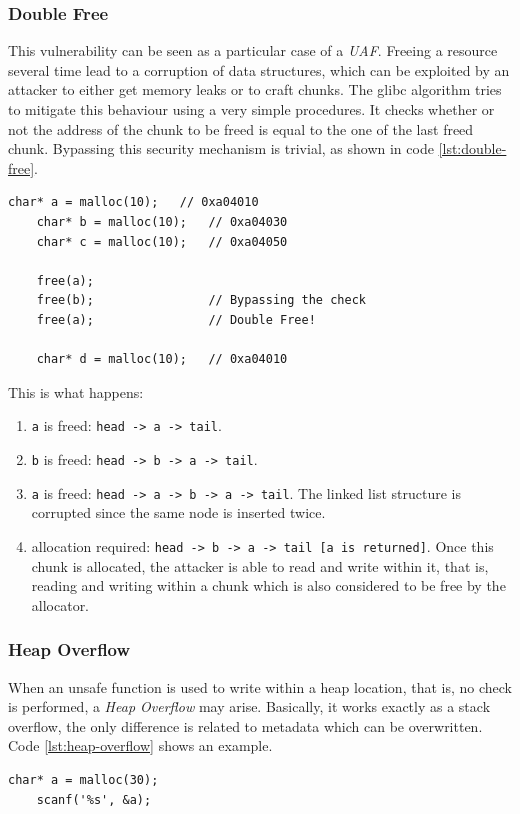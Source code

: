 \documentclass{article}
\numberwithin{equation}{subsection}
\begin{document}
\subsubsection{Double Free}
This vulnerability can be seen as a particular case of a \emph{UAF}. Freeing a resource several time lead to a corruption of data structures, which can be exploited by an attacker to either get memory leaks or to craft chunks. The glibc algorithm tries to mitigate this behaviour using a very simple procedures. It checks whether or not the address of the chunk to be freed is equal to the one of the last freed chunk. Bypassing this security mechanism is trivial, as shown in code \ref{lst:double-free}.\newline
\noindent
\begin{minipage}{\textwidth}
\centering
    \lstset{style=cstyle}
    \begin{lstlisting}[caption={Double Free vulnerable code.},captionpos=b,label={lst:double-free}]
    char* a = malloc(10);   // 0xa04010
    char* b = malloc(10);   // 0xa04030
    char* c = malloc(10);   // 0xa04050
    
    free(a);
    free(b);                // Bypassing the check
    free(a);                // Double Free!
    
    char* d = malloc(10);   // 0xa04010
\end{lstlisting}
\end{minipage}
\noindent
This is what happens:
\begin{enumerate}
    \item \texttt{a} is freed: \texttt{head -> a -> tail}.
    \item \texttt{b} is freed: \texttt{head -> b -> a -> tail}.
    \item \texttt{a} is freed: \texttt{head -> a ->  b -> a -> tail}. The linked list structure is corrupted since the same node is inserted twice.
    \item allocation required: \texttt{head ->  b -> a -> tail [a is returned]}. Once this chunk is allocated, the attacker is able to read and write within it, that is, reading and writing within a chunk which is also considered to be free by the allocator.
\end{enumerate}
\subsubsection{Heap Overflow}
When an unsafe function is used to write within a heap location, that is, no check is performed, a \emph{Heap Overflow} may arise. Basically, it works exactly as a stack overflow, the only difference is related to metadata which can be overwritten. Code \ref{lst:heap-overflow} shows an example.\newline
\noindent
\begin{minipage}{\textwidth}
\centering
    \lstset{style=cstyle}
    \begin{lstlisting}[caption={Double Free vulnerable code.},captionpos=b,label={lst:heap-overflow}]
    char* a = malloc(30);
    scanf('%s', &a);
\end{lstlisting}
\end{minipage}
\end{document}
